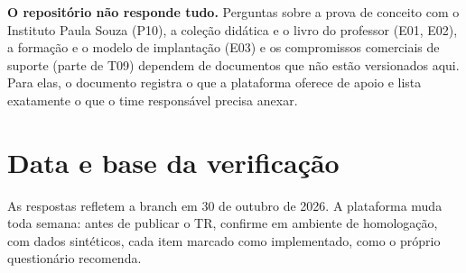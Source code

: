 \begin{atencao}
\textbf{O repositório não responde tudo.} Perguntas sobre a prova de conceito
com o Instituto Paula Souza (P10), a coleção didática e o livro do professor
(E01, E02), a formação e o modelo de implantação (E03) e os compromissos
comerciais de suporte (parte de T09) dependem de documentos que não estão
versionados aqui. Para elas, o documento registra o que a plataforma oferece de
apoio e lista exatamente o que o time responsável precisa anexar.
\end{atencao}

\section{Data e base da verificação}

As respostas refletem a branch  em 30 de outubro de 2026. A
plataforma muda toda semana: antes de publicar o TR, confirme em ambiente de
homologação, com dados sintéticos, cada item marcado como implementado, como o
próprio questionário recomenda.
